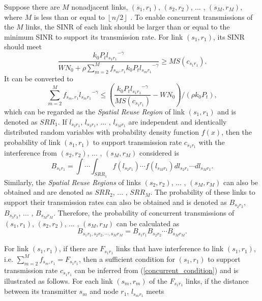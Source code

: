 \documentclass[journal]{IEEEtran}
\begin{document}
Suppose there are $M$ nonadjacent links, $({s_1},{r_1})$, $({s_2},{r_2})$, ... , $({s_M},{r_M})$,
where $M$ is less than or equal to $\left\lfloor {n/2} \right\rfloor$ \cite{mao}. To enable concurrent
transmissions of the $M$ links, the SINR of each link should be larger than or equal to the minimum
SINR to support its transmission rate. For link $({s_1},{r_1})$, its SINR should meet
\begin{equation}
\frac{{{k_0}{P_t}{l_{{s_1}{r_1}}}^{ - \gamma }}}{{W{N_0} + \rho \sum\limits_{m = 2}^M
{{f_{{s_m},{r_1}}}{k_0}{P_t}{l_{{s_m}{r_1}}}^{ - \gamma }} }} \ge MS({c_{{s_1}{r_1}}}).
\end{equation}
It can be converted to
\begin{equation}
 \sum\limits_{m = 2}^M
{{f_{{s_m},{r_1}}}{l_{{s_m}{r_1}}}^{ - \gamma }}  \le (\frac{{{k_0}{P_t}{l_{{s_1}{r_1}}}^{ - \gamma
}}}{{MS({c_{{s_1}{r_1}}})}} - W{N_0})/(\rho {k_0}{P_t}),\label{concurrent_condition}
\end{equation}
which can be regarded as the \emph{Spatial Reuse Region} of link $({s_1},{r_1})$ and is denoted as
$SR{R_1}$. If ${{l_{{s_2}{r_1}}}}$, ${{l_{{s_3}{r_1}}}}$, ... , ${{l_{{s_M}{r_1}}}}$ are
independent and identically distributed random variables with probability density function $f(x)$,
then the probability of link $({s_1},{r_1})$ to support transmission rate ${c_{{s_1}{r_1}}}$ with
the interference from $({s_2},{r_2})$, ... , $({s_M},{r_M})$ considered is
\begin{equation}
{B_{{s_1}{r_1}}} = \int  \cdots  \int_{SR{R_1}} {f({l_{{s_2}{r_1}}}) \cdots
f({l_{{s_M}{r_1}}})d{l_{{s_2}{r_1}}} \cdots d{l_{{s_M}{r_1}}}}.
\end{equation}
Similarly, the \emph{Spatial Reuse Regions} of links $({s_2},{r_2})$, ... , $({s_M},{r_M})$ can
also be obtained and are denoted as $SR{R_2}$, ... , $SR{R_M}$. The probability of these links to
support their transmission rates can also be obtained and is denoted as ${B_{{s_2}{r_2}}}$,
${B_{{s_3}{r_3}}}$, ... , ${B_{{s_M}{r_M}}}$. Therefore, the probability of concurrent
transmissions of $({s_1},{r_1})$, $({s_2},{r_2})$, ... , $({s_M},{r_M})$ can be calculated as
\begin{equation}
{B_{{s_1}{r_1},{s_2}{r_2}, \cdots ,{s_M}{r_M}}} = {B_{{s_1}{r_1}}}{B_{{s_2}{r_2}}} \cdots
{B_{{s_M}{r_M}}}.
\end{equation}

For link $({s_1},{r_1})$, if there are ${F_{{s_1}{r_1}}}$ links that have interference to link
$({s_1},{r_1})$, i.e. $\sum\limits_{m = 2}^M {{f_{{s_m},{r_1}}}}  = {F_{{s_1}{r_1}}}$, then a
sufficient condition for $({s_1},{r_1})$ to support transmission rate ${c_{{s_1}{r_1}}}$ can be
inferred from (\ref{concurrent_condition}) and is illustrated as follows. For each link
$({s_m},{r_m})$ of the ${F_{{s_1}{r_1}}}$ links, if the distance between its transmitter $s_m$ and
node $r_1$, ${l_{{s_m}{r_1}}}$ meets
\end{document}
